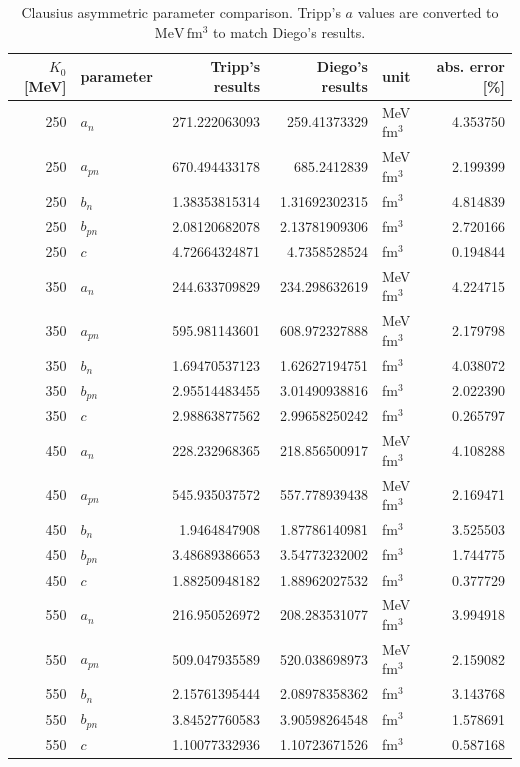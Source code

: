 \begin{table}[ht]
\centering
\caption{Clausius asymmetric parameter comparison. Tripp's $a$ values are converted to $\mathrm{MeV\,fm^3}$ to match Diego's results.}
\begin{tabular}{r l r r l r}
\hline
$K_0$ [MeV] & parameter & Tripp's results & Diego's results & unit & abs. error [\%] \\
\hline
250 & $a_n$ & 271.222063093 & 259.41373329 & MeV fm$^3$ & 4.353750 \\
250 & $a_{pn}$ & 670.494433178 & 685.2412839 & MeV fm$^3$ & 2.199399 \\
250 & $b_n$ & 1.38353815314 & 1.31692302315 & fm$^3$ & 4.814839 \\
250 & $b_{pn}$ & 2.08120682078 & 2.13781909306 & fm$^3$ & 2.720166 \\
250 & $c$ & 4.72664324871 & 4.7358528524 & fm$^3$ & 0.194844 \\
\hline
350 & $a_n$ & 244.633709829 & 234.298632619 & MeV fm$^3$ & 4.224715 \\
350 & $a_{pn}$ & 595.981143601 & 608.972327888 & MeV fm$^3$ & 2.179798 \\
350 & $b_n$ & 1.69470537123 & 1.62627194751 & fm$^3$ & 4.038072 \\
350 & $b_{pn}$ & 2.95514483455 & 3.01490938816 & fm$^3$ & 2.022390 \\
350 & $c$ & 2.98863877562 & 2.99658250242 & fm$^3$ & 0.265797 \\
\hline
450 & $a_n$ & 228.232968365 & 218.856500917 & MeV fm$^3$ & 4.108288 \\
450 & $a_{pn}$ & 545.935037572 & 557.778939438 & MeV fm$^3$ & 2.169471 \\
450 & $b_n$ & 1.9464847908 & 1.87786140981 & fm$^3$ & 3.525503 \\
450 & $b_{pn}$ & 3.48689386653 & 3.54773232002 & fm$^3$ & 1.744775 \\
450 & $c$ & 1.88250948182 & 1.88962027532 & fm$^3$ & 0.377729 \\
\hline
550 & $a_n$ & 216.950526972 & 208.283531077 & MeV fm$^3$ & 3.994918 \\
550 & $a_{pn}$ & 509.047935589 & 520.038698973 & MeV fm$^3$ & 2.159082 \\
550 & $b_n$ & 2.15761395444 & 2.08978358362 & fm$^3$ & 3.143768 \\
550 & $b_{pn}$ & 3.84527760583 & 3.90598264548 & fm$^3$ & 1.578691 \\
550 & $c$ & 1.10077332936 & 1.10723671526 & fm$^3$ & 0.587168 \\
\hline
\end{tabular}
\end{table}
